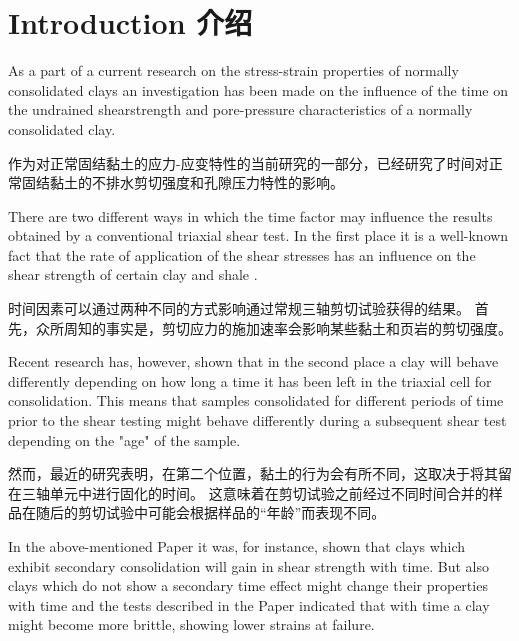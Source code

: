 \section{Introduction 介绍}

\begin{paracol}{2}

    As a part of a current research on the stress-strain properties of normally consolidated clays an investigation has been made on the influence of the time on the undrained shearstrength and pore-pressure characteristics of a normally consolidated clay.

    \switchcolumn

    作为对正常固结黏土的应力-应变特性的当前研究的一部分，已经研究了时间对正常固结黏土的不排水剪切强度和孔隙压力特性的影响。

    \switchcolumn*

    There are two different ways in which the time factor may influence the results obtained by a conventional triaxial shear test. In the first place it is a well-known fact that the rate of application of the shear stresses has an influence on the shear strength of certain clay and shale \citep{Casacrande1951}.

    \switchcolumn
        
    时间因素可以通过两种不同的方式影响通过常规三轴剪切试验获得的结果。 首先，众所周知的事实是，剪切应力的施加速率会影响某些黏土和页岩的剪切强度\citep{Casacrande1951}。

    \switchcolumn*
    
    Recent research \citep{Bjerrum1958148} has, however, shown that in the second place a clay will behave differently depending on how long a time it has been left in the triaxial cell for consolidation. This means that samples consolidated for different periods of time prior to the shear testing might behave differently during a subsequent shear test depending on the "age" of the sample.

    \switchcolumn
            
    然而，最近的研究\citep{Bjerrum1958148}表明，在第二个位置，黏土的行为会有所不同，这取决于将其留在三轴单元中进行固化的时间。 这意味着在剪切试验之前经过不同时间合并的样品在随后的剪切试验中可能会根据样品的“年龄”而表现不同。

    \switchcolumn*

    In the above-mentioned Paper it was, for instance, shown that clays which exhibit secondary consolidation will gain in shear strength with time. But also clays which do not show a secondary time effect might change their properties with time and the tests described in the Paper indicated that with time a clay might become more brittle, showing lower strains at failure.


\end{paracol}
